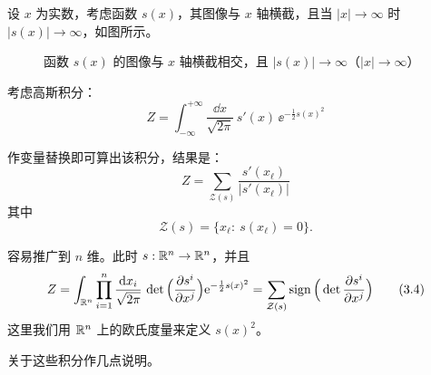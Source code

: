 设 $x$ 为实数，考虑函数 $s(x)$，其图像与 $x$ 轴横截，且当 $|x|\to\infty$ 时
$|s(x)|\to\infty$，如图所示。

\begin{figure}[H]
  \centering
  \caption{函数 $s(x)$ 的图像与 $x$ 轴横截相交，且 $|s(x)|\to\infty$（$|x|\to\infty$）}
  \label{fig:nice-integral}
\end{figure}

考虑高斯积分：
\begin{equation}
Z = \int_{-\infty}^{+\infty}\frac{\dd x}{\sqrt{2\pi}}\,s'(x)\,
\ee^{-\frac{1}{2}s(x)^2}
\tag{3.1}
\end{equation}

作变量替换即可算出该积分，结果是：
\begin{equation}
Z = \sum_{\mathcal Z(s)}\frac{s'(x_\ell)}{|s'(x_\ell)|}
\tag{3.2}
\end{equation}
其中
\begin{equation}
\mathcal Z(s) = \{x_\ell:\ s(x_\ell)=0\}.
\tag{3.3}
\end{equation}

容易推广到 $n$ 维。此时 $s:\mathbb{R}^n\to\mathbb{R}^n$，并且
\begin{equation}
Z = \int_{\mathbb{R}^n}\prod_{i=1}^{n}\frac{\mathrm{d} x_i}{\sqrt{2\pi}}\,
\det\Big(\frac{\partial s^i}{\partial x^j}\Big)\mathrm{e}^{-\frac{1}{2}s(x)^2}
= \sum_{\mathcal Z(s)}\operatorname{sign}\Big(\det\frac{\partial s^i}{\partial x^j}\Big)
\tag{3.4}
\end{equation}
这里我们用 $\mathbb{R}^n$ 上的欧氏度量来定义 $s(x)^2$。

关于这些积分作几点说明。

